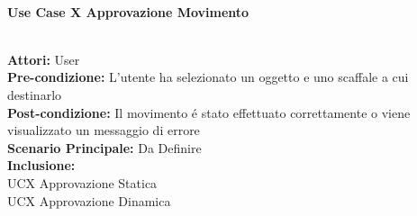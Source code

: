 \vspace{0.5cm}

\Large\textbf{}\\
\Large\textbf{Use Case X Approvazione Movimento} \\

\vspace{0.5cm}

\large\textbf{} \\
\textbf{Attori:} User\\
\textbf{Pre-condizione:} L'utente ha selezionato un oggetto e uno scaffale a cui destinarlo \\
\textbf{Post-condizione: } Il movimento é stato effettuato correttamente o viene visualizzato un messaggio di errore\\
\textbf{Scenario Principale:} Da Definire \\
\textbf{Inclusione:} \\
UCX Approvazione Statica \\
UCX Approvazione Dinamica \\

\vspace{0.5cm}

\textbf{}\\
{} \\
{}\\